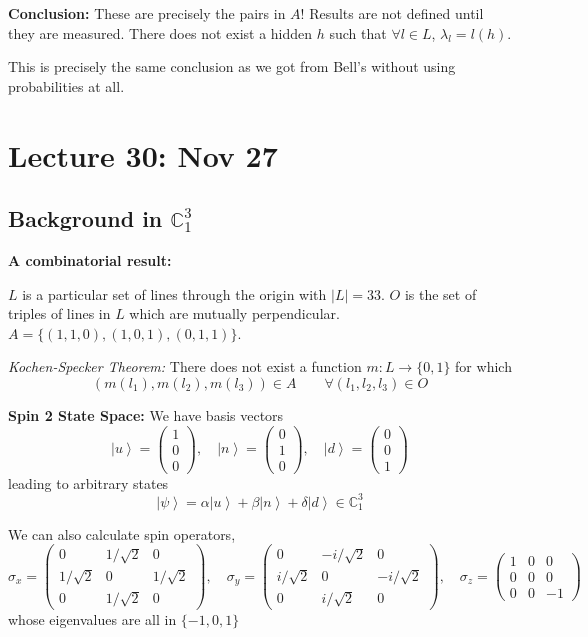 \documentclass[12pt]{article}
\newcommand{\C}{\mathbb{C}}
\newcommand{\ket}[1]{\left\vert #1 \right\rangle}
\newcommand{\abs}[1]{\left\vert #1 \right\vert}
\begin{document}
        \textbf{Conclusion:} These are precisely the pairs in $A$! Results are not defined until they are measured. There does not exist a hidden $h$ such that $\forall l \in L$, $\lambda_l = l(h)$.

        This is precisely the same conclusion as we got from Bell's without using probabilities at all. 

\section*{Lecture 30: Nov 27}
    \subsection*{Background in $\C_1^3$}
        \textbf{A combinatorial result:}
        
        $L$ is a particular set of lines through the origin with $\abs{L} = 33$. $O$ is the set of triples of lines in $L$ which are mutually perpendicular. $A = \{(1, 1, 0), (1, 0, 1), (0, 1, 1)\}$. 

        \emph{Kochen-Specker Theorem:} There does not exist a function $m: L \to \{0, 1\}$ for which 
        \[(m(l_1), m(l_2), m(l_3)) \in A \qquad \forall (l_1, l_2, l_3) \in O\]

        \textbf{Spin 2 State Space:} We have basis vectors
        \[\ket{u} = \begin{pmatrix}
            1\\0\\0
        \end{pmatrix}, \quad \ket{n} = \begin{pmatrix}
            0\\1\\0
        \end{pmatrix}, \quad \ket{d} = \begin{pmatrix}
            0\\0\\1
        \end{pmatrix}\]
        leading to arbitrary states 
        \[\ket{\psi} = \alpha\ket u + \beta \ket n + \delta \ket{d} \in \C_1^3\]

        We can also calculate spin operators, 
        \[\sigma_x = \begin{pmatrix}
            0 & 1/\sqrt 2 & 0\\
            1/\sqrt 2 & 0 & 1/\sqrt 2\\
            0 & 1/\sqrt 2 & 0
        \end{pmatrix}, \quad \sigma_y = \begin{pmatrix}
            0 & -i/\sqrt 2 & 0\\
            i/\sqrt 2 & 0 & -i/\sqrt 2\\
            0 & i/\sqrt 2 & 0
        \end{pmatrix}, \quad \sigma_z = \begin{pmatrix}
            1 & 0 & 0\\
            0 & 0 & 0\\
            0 & 0 & -1
        \end{pmatrix}\]
        whose eigenvalues are all in $\{-1, 0, 1\}$ 
\end{document}
